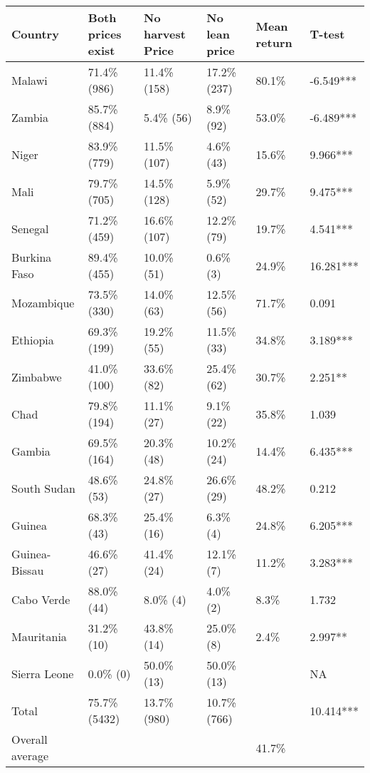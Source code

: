\begin{table}[ht]
\centering
\begin{tabular}{llllll}
  \hline
Country & Both prices exist & No harvest Price & No lean price & Mean return & T-test \\ 
  \hline
Malawi & 71.4\%  (986) & 11.4\% (158) & 17.2\% (237) & 80.1\% & -6.549*** \\ 
  Zambia & 85.7\%  (884) & 5.4\%  (56) & 8.9\%  (92) & 53.0\% & -6.489*** \\ 
  Niger & 83.9\%  (779) & 11.5\% (107) & 4.6\%  (43) & 15.6\% & 9.966*** \\ 
  Mali & 79.7\%  (705) & 14.5\% (128) & 5.9\%  (52) & 29.7\% & 9.475*** \\ 
  Senegal & 71.2\%  (459) & 16.6\% (107) & 12.2\%  (79) & 19.7\% & 4.541*** \\ 
  Burkina Faso & 89.4\%  (455) & 10.0\%  (51) & 0.6\%   (3) & 24.9\% & 16.281*** \\ 
  Mozambique & 73.5\%  (330) & 14.0\%  (63) & 12.5\%  (56) & 71.7\% & 0.091  \\ 
  Ethiopia & 69.3\%  (199) & 19.2\%  (55) & 11.5\%  (33) & 34.8\% & 3.189*** \\ 
  Zimbabwe & 41.0\%  (100) & 33.6\%  (82) & 25.4\%  (62) & 30.7\% & 2.251** \\ 
  Chad & 79.8\%  (194) & 11.1\%  (27) & 9.1\%  (22) & 35.8\% & 1.039  \\ 
  Gambia & 69.5\%  (164) & 20.3\%  (48) & 10.2\%  (24) & 14.4\% & 6.435*** \\ 
  South Sudan & 48.6\%   (53) & 24.8\%  (27) & 26.6\%  (29) & 48.2\% & 0.212  \\ 
  Guinea & 68.3\%   (43) & 25.4\%  (16) & 6.3\%   (4) & 24.8\% & 6.205*** \\ 
  Guinea-Bissau & 46.6\%   (27) & 41.4\%  (24) & 12.1\%   (7) & 11.2\% & 3.283*** \\ 
  Cabo Verde & 88.0\%   (44) & 8.0\%   (4) & 4.0\%   (2) & 8.3\% & 1.732  \\ 
  Mauritania & 31.2\%   (10) & 43.8\%  (14) & 25.0\%   (8) & 2.4\% & 2.997** \\ 
  Sierra Leone & 0.0\%    (0) & 50.0\%  (13) & 50.0\%  (13) &  & NA \\ 
  Total & 75.7\% (5432) & 13.7\% (980) & 10.7\% (766) &  & 10.414*** \\ 
  Overall average &  &  &  & 41.7\% &  \\ 
   \hline
\end{tabular}
\end{table}
